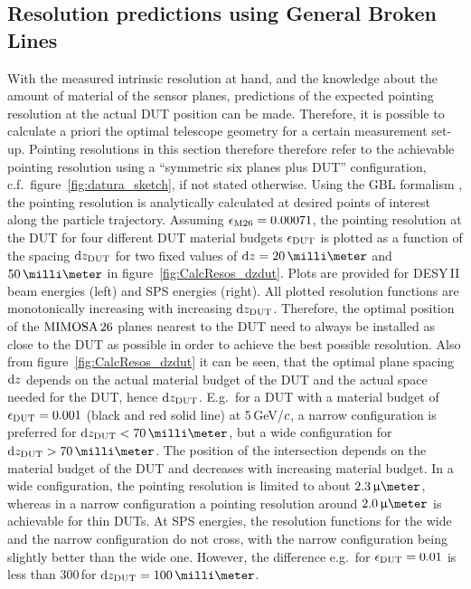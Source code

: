 \subsection{Resolution predictions using General Broken Lines}

With the measured intrinsic resolution at hand, and the knowledge about the amount of material of the sensor planes, predictions of the expected pointing resolution at the actual DUT position can be made. 
Therefore, it is possible to calculate a priori the optimal telescope geometry for a certain measurement set-up. 
Pointing resolutions in this section therefore therefore refer to the achievable pointing resolution using a ``symmetric six planes plus DUT'' configuration,
 c.f.~figure~\ref{fig:datura_sketch}, if not stated otherwise.
Using the GBL formalism \cite{Kleinwort-2012,Blobel-2006}, the pointing resolution is analytically calculated at desired points of interest along the particle trajectory. 
Assuming $\mathnormal{\epsilon_{\textrm{M26}}} = 0.00071$, the pointing resolution at the DUT for four different DUT material budgets $\mathnormal{\epsilon_{\textrm{DUT}}}$ is plotted as a function of the spacing $\textrm{d}z_{\textrm{DUT}}$
 for two fixed values of $\dz = 20\,\milli\meter$ and $50\,\milli\meter$ in figure~\ref{fig:CalcResos_dzdut}. 
Plots are provided for DESY\,II beam energies (left) and SPS energies (right). 
All plotted resolution functions are monotonically increasing with increasing $\textrm{d}z_{\textrm{DUT}}$. 
Therefore, the optimal position of the $\textrm{MIMOSA\,26}$ planes nearest to the DUT need to always be installed as close to the DUT as possible in order to achieve the best possible resolution. 
Also from figure~\ref{fig:CalcResos_dzdut} it can be seen, that the optimal plane spacing $\textrm{d}z$ depends on the actual material budget of the DUT and the actual space needed for the DUT, hence $\textrm{d}z_{\textrm{DUT}}$.
E.g.~for a DUT with a material budget of $\mathnormal{\epsilon_{\textrm{DUT}}} = 0.001$ (black and red solid line) at 5\,GeV/$\mathnormal{c}$, a narrow configuration is preferred for $\dzdut < 70\,\milli\meter$,
 but a wide configuration for $\dzdut > 70\,\milli\meter$.
The position of the intersection depends on the material budget of the DUT and decreases with increasing material budget. 
In a wide configuration, the pointing resolution is limited to about $2.3\,\upmu\meter$, whereas in a narrow configuration a pointing resolution around $2.0\,\upmu\meter$ is achievable for thin DUTs.
At SPS energies, the resolution functions for the wide and the narrow configuration do not cross, with the narrow configuration being slightly better than the wide one.
However, the difference e.g.~for $\mathnormal{\epsilon_{\textrm{DUT}}} = 0.01$ is less than 300\,\nano\meter for $\dzdut = 100\,\milli\meter$.

